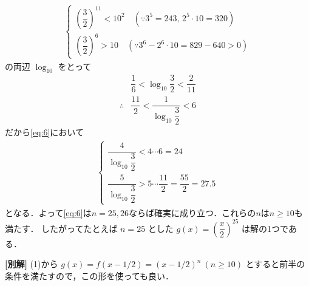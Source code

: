 \documentclass[../../main.tex]{subfiles}
\begin{document}
\begin{align}
  \begin{cases}
    \left(\dfrac{3}{2}\right)^{11} < 10^2 \quad (\because 3^5 = 243, \, 2^5 \cdot 10 = 320) \\
    \left(\dfrac{3}{2}\right)^6 > 10 \quad (\because 3^6 - 2^6 \cdot 10 = 829 - 640 > 0)
  \end{cases}
\end{align}
の両辺 $\log_{10}$ をとって
\begin{align}
  & \dfrac{1}{6} < \log_{10} \dfrac{3}{2} < \dfrac{2}{11} \\
  \therefore
  & \dfrac{11}{2} < \dfrac{1}{\log_{10} \dfrac{3}{2}} < 6
\end{align}
だから\cref{eq:6}において
\begin{align}
  \begin{cases}
    \dfrac{4}{\log_{10} \dfrac{3}{2}} < 4\cdots 6 = 24 \\
    \dfrac{5}{\log_{10} \dfrac{3}{2}} > 5\cdots \dfrac{11}{2} = \dfrac{55}{2} = 27.5
  \end{cases}
\end{align}
となる．よって\cref{eq:6}は$n=25,26$ならば確実に成り立つ．これらの$n$は$n \ge 10$も満たす．
したがってたとえば $n = 25$ とした $g(x) = \left(\dfrac{x}{2}\right)^{25}$ は解の1つである．

{\bf [別解]}
(1)から $g(x) = f(x - 1/2) = (x - 1/2)^n \ (n \ge 10)$ とすると前半の条件を満たすので，この形を使っても良い．

\newpage
\end{document}
